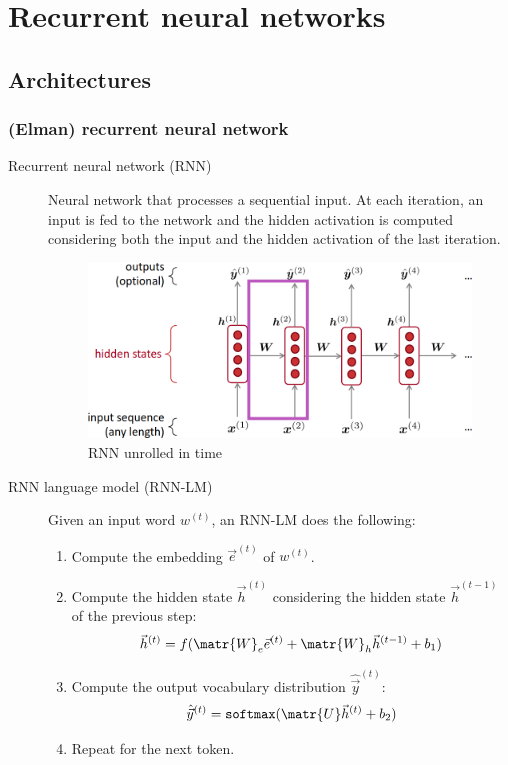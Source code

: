 \chapter{Recurrent neural networks}


\section{Architectures}


\subsection{(Elman) recurrent neural network}

\begin{description}
    \item[Recurrent neural network (RNN)] 
        Neural network that processes a sequential input. At each iteration, an input is fed to the network and the hidden activation is computed considering both the input and the hidden activation of the last iteration.

        \begin{figure}[H]
            \centering
            \includegraphics[width=0.5\linewidth]{./img/rnn_unrolled.png}
            \caption{RNN unrolled in time}
        \end{figure}

    \item[RNN language model (RNN-LM)] 
    Given an input word $w^{(t)}$, an RNN-LM does the following:
    \begin{enumerate}
        \item Compute the embedding $\vec{e}^{(t)}$ of $w^{(t)}$.
        \item Compute the hidden state $\vec{h}^{(t)}$ considering the hidden state $\vec{h}^{(t-1)}$ of the previous step:
        \[ \vec{h}^{(t)} = f(\matr{W}_e \vec{e}^{(t)} + \matr{W}_h \vec{h}^{(t-1)} + b_1) \]
        \item Compute the output vocabulary distribution $\hat{\vec{y}}^{(t)}$:
        \[ \hat{\vec{y}}^{(t)} = \texttt{softmax}(\matr{U}\vec{h}^{(t)} + b_2) \]
        \item Repeat for the next token.
    \end{enumerate}


\end{description}
